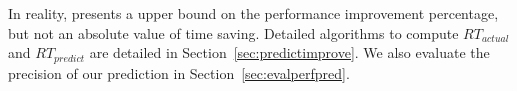 In reality, \Cheetah{} presents a upper bound on the performance improvement percentage, but not an absolute value of time saving. 
Detailed algorithms to compute $RT_{actual}$ and $RT_{predict}$ are detailed in Section~\ref{sec:predictimprove}. We also evaluate the precision of our prediction in Section~\ref{sec:evalperfpred}.


